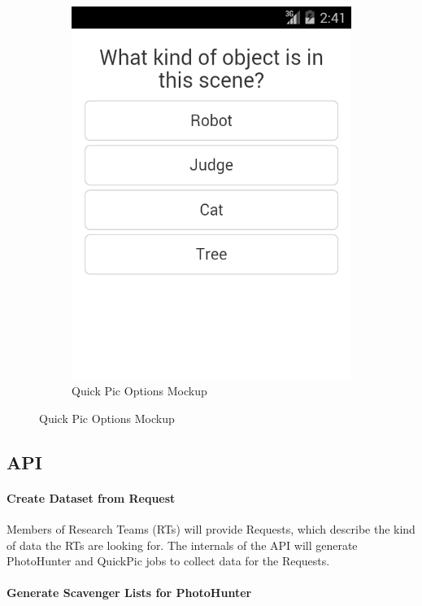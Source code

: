 \documentclass{article}
\begin{document}
\begin{figure}
\begin{subfigure}[b]{0.49\textwidth}
    \includegraphics[width=\textwidth]{ss_quickpic_options}
    \caption{Quick Pic Options Mockup}
  \end{subfigure}
\end{figure}

\subsection{API}

\paragraph{Create Dataset from Request}

Members of Research Teams (RTs) will provide Requests, which describe
the kind of data the RTs are looking for.  The internals of the API will
generate PhotoHunter and QuickPic jobs to collect data for the
Requests.

\paragraph{Generate Scavenger Lists for PhotoHunter}
\end{document}
